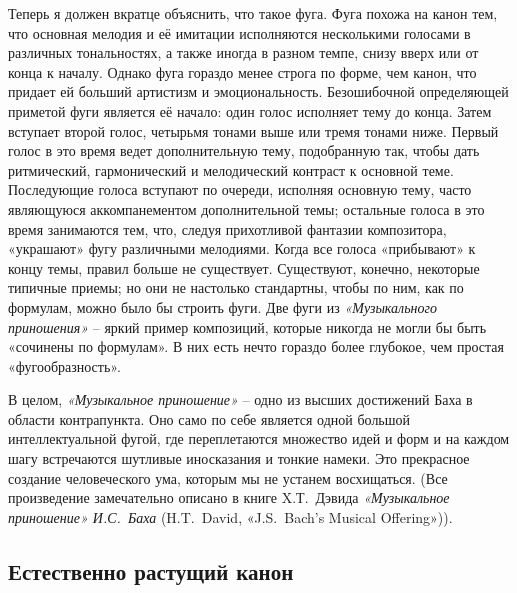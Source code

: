 \documentclass[../main.tex]{subfiles}
\begin{document}
Теперь я должен вкратце объяснить, что такое фуга. Фуга похожа на канон тем, что основная мелодия и её имитации исполняются несколькими голосами в различных тональностях, а также иногда в разном темпе, снизу вверх или от конца к началу. Однако фуга гораздо менее строга по форме, чем канон, что придает ей больший артистизм и эмоциональность. Безошибочной определяющей приметой фуги является её начало: один голос исполняет тему до конца. Затем вступает второй голос, четырьмя тонами выше или тремя тонами ниже. Первый голос в это время ведет дополнительную тему, подобранную так, чтобы дать ритмический, гармонический и мелодический контраст к основной теме. Последующие голоса вступают по очереди, исполняя основную тему, часто являющуюся аккомпанементом дополнительной темы; остальные голоса в это время занимаются тем, что, следуя прихотливой фантазии композитора, «украшают» фугу различными мелодиями. Когда все голоса «прибывают» к концу темы, правил больше не существует. Существуют, конечно, некоторые типичные приемы; но они не настолько стандартны, чтобы по ним, как по формулам, можно было бы строить фуги. Две фуги из \emph{«Музыкального приношения»} \--- яркий пример композиций, которые никогда не могли бы быть «сочинены по формулам». В них есть нечто гораздо более глубокое, чем простая «фугообразность».

В целом, \emph{«Музыкальное приношение»} \--- одно из высших достижений Баха в области контрапункта. Оно само по себе является одной большой интеллектуальной фугой, где переплетаются множество идей и форм и на каждом шагу встречаются шутливые иносказания и тонкие намеки. Это прекрасное создание человеческого ума, которым мы не устанем восхищаться. (Все произведение замечательно описано в книге X.Т.~Дэвида \emph{«Музыкальное приношение» И.С.~Баха} (H.T.~David, «J.S.~Bach's Musical Offering»)).


\subsection{Естественно растущий канон}
\end{document}

